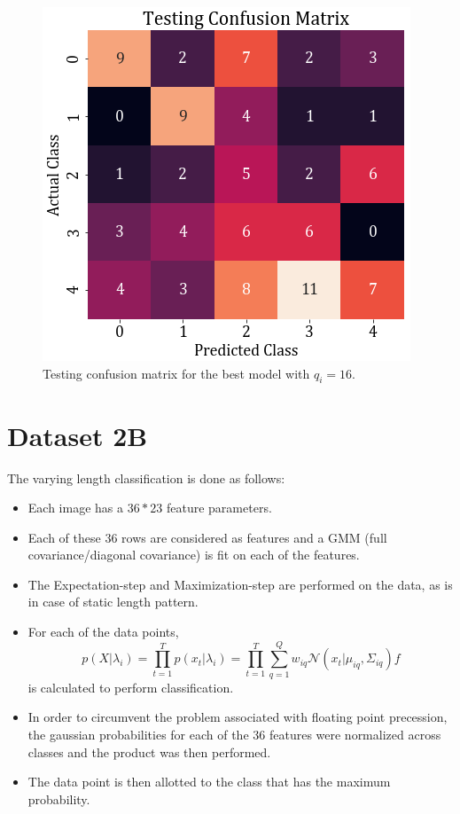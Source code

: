 \documentclass[11pt,a4paper]{article}
\begin{document}
\begin{figure}[H]
    \centering
    \includegraphics[scale=0.5]{images/2A/2A_diag_test_conf.png}
    \caption{Testing confusion matrix for the best model with $q_i=16$.}
\end{figure}


\break
\section{Dataset 2B}
The varying length classification is done as follows:
\begin{itemize}
    \itemsep0em
    \item Each image has a $36*23$ feature parameters.
    \item Each of these $36$ rows are considered as features and a GMM (full covariance/diagonal covariance) is fit on each of the features.
    \item The Expectation-step and Maximization-step are performed on the data, as is in case of static length pattern.
    \item For each of the data points, 
    \begin{equation}
    p (X|\lambda_i ) = \prod_{t=1}^T p(x_t|\lambda_i) = \prod_{t=1}^T \sum_{q=1}^Q w_{iq}\mathcal{N}(x_t|\mu_{iq}, \Sigma_{iq})f
    \end{equation}
    is calculated to perform classification.
    \item In order to circumvent the problem associated with floating point precession, the gaussian probabilities for each of the 36 features were normalized across classes and the product was then performed.
    \item The data point is then allotted to the class that has the maximum probability.
\end{itemize}
\end{document}
